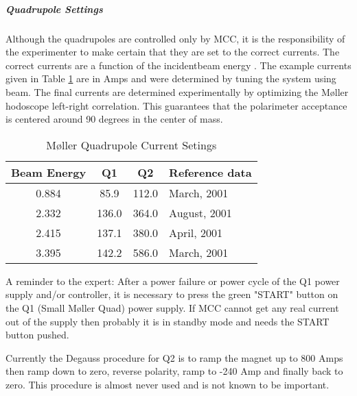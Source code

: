 {\subparagraph{Quadrupole Settings}

Although the quadrupoles are controlled only by MCC, it is the 
responsibility of the experimenter to make certain that they are
set to the correct currents.
The correct currents are a function of the incidentbeam energy . The example currents given in Table \ref{tab_qcurrent} are in Amps
and were determined by tuning the system using beam. The final currents 
are determined experimentally by optimizing the
M\o ller hodoscope left-right correlation. This guarantees that the polarimeter
acceptance is centered around 90 degrees in the center of mass.
%
\begin{table}[!hbt]
\begin{center}
\begin{tabular}{|c|c|c|l|} \hline
Beam Energy & Q1  & Q2 &Reference data \\
\hline
0.884 &  85.9 & 112.0 & March, 2001  \\
2.332 & 136.0 & 364.0 & August, 2001 \\
2.415 & 137.1 & 380.0 & April, 2001  \\
3.395 & 142.2 & 586.0 & March, 2001  \\
\hline 
\end{tabular}
\caption{M\o ller Quadrupole Current Setings\label{tab_qcurrent}}
\end{center}
\end{table}

A reminder to the expert: After a power failure or power cycle of the Q1 
power supply and/or controller,
it is necessary to press the green "START" button on the Q1 (Small
M\o ller Quad) power supply.  If MCC cannot get any real current out of the
supply then probably it is in standby mode and needs the START button pushed.

Currently the Degauss procedure for Q2 is to ramp the magnet up to 800 Amps 
then ramp down to zero, reverse polarity, ramp to -240 Amp and finally
back to zero. This procedure is almost never used and is not known to
be important.

}
